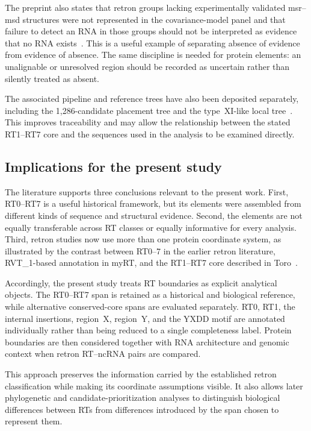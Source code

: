 The preprint also states that retron groups lacking experimentally validated
msr--msd structures were not represented in the covariance-model panel and
that failure to detect an RNA in those groups should not be interpreted as
evidence that no RNA exists~\cite{toro2026}. This is a useful example of
separating absence of evidence from evidence of absence. The same discipline
is needed for protein elements: an unalignable or unresolved region should be
recorded as uncertain rather than silently treated as absent.

The associated pipeline and reference trees have also been deposited
separately, including the 1,286-candidate placement tree and the type~XI-like
local tree~\cite{toro2026zenodo}. This improves traceability and may allow the
relationship between the stated RT1--RT7 core and the sequences used in the
analysis to be examined directly.

\subsection{Implications for the present study}

The literature supports three conclusions relevant to the present work. First,
RT0--RT7 is a useful historical framework, but its elements were assembled
from different kinds of sequence and structural evidence. Second, the elements
are not equally transferable across RT classes or equally informative for
every analysis. Third, retron studies now use more than one protein coordinate
system, as illustrated by the contrast between RT0--7 in the earlier retron
literature, RVT\_1-based annotation in myRT, and the RT1--RT7 core described
in Toro~\cite{toro2026}.

Accordingly, the present study treats RT boundaries as explicit analytical
objects. The RT0--RT7 span is retained as a historical and biological reference,
while alternative conserved-core spans are evaluated separately. RT0, RT1,
the internal insertions, region~X, region~Y, and the YXDD motif are annotated
individually rather than being reduced to a single completeness label. Protein
boundaries are then considered together with RNA architecture and genomic
context when retron RT--ncRNA pairs are compared.

This approach preserves the information carried by the established retron
classification while making its coordinate assumptions visible. It also
allows later phylogenetic and candidate-prioritization analyses to distinguish
biological differences between RTs from differences introduced by the span
chosen to represent them.



